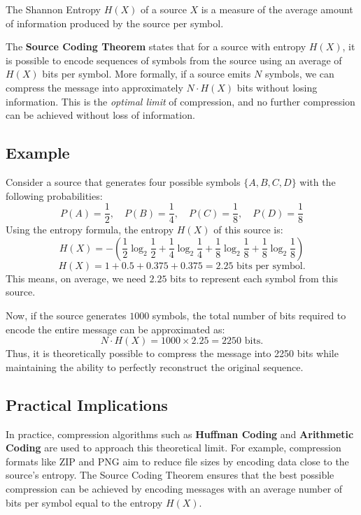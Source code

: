 \documentclass[12pt]{article}
\begin{document}
The Shannon Entropy $H(X)$ of a source $X$ is a measure of the average amount of information produced by the source per symbol.

The \textbf{Source Coding Theorem} states that for a source with entropy $H(X)$, it is possible to encode sequences of symbols from the source using an average of $H(X)$ bits per symbol. More formally, if a source emits $N$ symbols, we can compress the message into approximately $N \cdot H(X)$ bits without losing information. This is the \textit{optimal limit} of compression, and no further compression can be achieved without loss of information.

\subsection{Example}

Consider a source that generates four possible symbols $\{A, B, C, D\}$ with the following probabilities:
\[
P(A) = \frac{1}{2}, \quad P(B) = \frac{1}{4}, \quad P(C) = \frac{1}{8}, \quad P(D) = \frac{1}{8}
\]
Using the entropy formula, the entropy $H(X)$ of this source is:
\[
H(X) = - \left( \frac{1}{2} \log_2 \frac{1}{2} + \frac{1}{4} \log_2 \frac{1}{4} + \frac{1}{8} \log_2 \frac{1}{8} + \frac{1}{8} \log_2 \frac{1}{8} \right)
\]
\[
H(X) = 1 + 0.5 + 0.375 + 0.375 = 2.25 \text{ bits per symbol}.
\]
This means, on average, we need $2.25$ bits to represent each symbol from this source.

Now, if the source generates $1000$ symbols, the total number of bits required to encode the entire message can be approximated as:
\[
N \cdot H(X) = 1000 \times 2.25 = 2250 \text{ bits}.
\]
Thus, it is theoretically possible to compress the message into 2250 bits while maintaining the ability to perfectly reconstruct the original sequence.

\subsection{Practical Implications}

In practice, compression algorithms such as \textbf{Huffman Coding} and \textbf{Arithmetic Coding} are used to approach this theoretical limit. For example, compression formats like ZIP and PNG aim to reduce file sizes by encoding data close to the source’s entropy. The Source Coding Theorem ensures that the best possible compression can be achieved by encoding messages with an average number of bits per symbol equal to the entropy $H(X)$.
\end{document}
